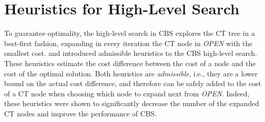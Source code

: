 \documentclass[letterpaper]{article} %
\newcommand\konstantin[1]{\nb{\textbf{Konstantin:}}{red}{#1}}
\newcommand{\cbs}{\ac{CBS}\xspace}
\newcommand{\cbsh}{{CBS-H}\xspace}
\newcommand{\ct}{\ac{CT}\xspace}
\newcommand{\soc}{\ac{SOC}\xspace}
\newcommand{\astar}{A$^*$\xspace}
\newcommand{\mapf}{\ac{MAPF}\xspace}
\newcommand{\open}{\textit{OPEN}\xspace}
\begin{document}


\section{Heuristics for High-Level Search}




To guarantee optimality, the high-level search in \cbs explores the \ct tree in a best-first fashion, expanding in every iteration the \ct node in \open with the smallest cost. %
\citet{felner2018adding} and \citet{CBSH2} introduced admissible heuristics to the \cbs high-level search. 
These heuristics estimate the cost difference between the cost of a node and the cost of the optimal solution. Both heuristics are \emph{admissible}, i.e., they are a lower bound on the actual cost difference, and therefore can be safely added to the cost of a \ct node when choosing which node to expand next from \open. 
Indeed, these heuristics were shown to significantly decrease the number of the expanded \ct nodes and improve the performance of \cbs. 
\end{document}
